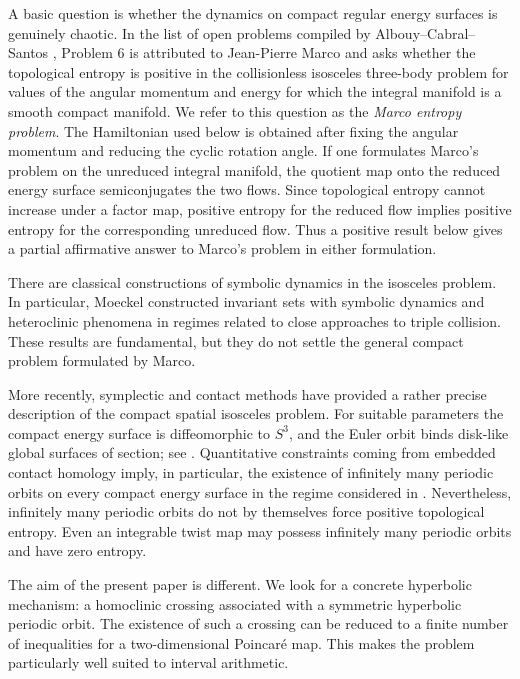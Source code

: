 \documentclass[11pt]{article}
\begin{document}
A basic question is whether the dynamics on compact regular energy surfaces
is genuinely chaotic.  In the list of open problems compiled by
Albouy--Cabral--Santos \cite{AlbouyCabralSantos}, Problem 6 is attributed to
Jean-Pierre Marco and asks whether the topological entropy is positive in
the collisionless isosceles three-body problem for values of the angular
momentum and energy for which the integral manifold is a smooth compact
manifold.  We refer to this question as the \emph{Marco entropy problem}.
The Hamiltonian used below is obtained after fixing the angular momentum and
reducing the cyclic rotation angle.  If one formulates Marco's problem on the
unreduced integral manifold, the quotient map onto the reduced energy surface
semiconjugates the two flows.  Since topological entropy cannot increase under
a factor map, positive entropy for the reduced flow implies positive entropy
for the corresponding unreduced flow.  Thus a positive result below gives a
partial affirmative answer to Marco's problem in either formulation.

There are classical constructions of symbolic dynamics in the isosceles
problem.  In particular, Moeckel \cite{Moeckel1984} constructed invariant
sets with symbolic dynamics and heteroclinic phenomena in regimes related to
close approaches to triple collision.  These results are fundamental, but
they do not settle the general compact problem formulated by Marco.

More recently, symplectic and contact methods have provided a rather precise
description of the compact spatial isosceles problem.  For suitable
parameters the compact energy surface is diffeomorphic to $S^3$, and the
Euler orbit binds disk-like global surfaces of section; see
\cite{HuLiuOuSalomaoYu}.  Quantitative constraints coming from embedded
contact homology imply, in particular, the existence of infinitely many
periodic orbits on every compact energy surface in the regime considered in
\cite{ECHconstraints}.  Nevertheless, infinitely many periodic orbits do not
by themselves force positive topological entropy.  Even an integrable twist
map may possess infinitely many periodic orbits and have zero entropy.

The aim of the present paper is different.  We look for a concrete
hyperbolic mechanism: a homoclinic crossing associated with a symmetric
hyperbolic periodic orbit.  The existence of such a crossing can be reduced
to a finite number of inequalities for a two-dimensional Poincar\'e map.
This makes the problem particularly well suited to interval arithmetic.
\end{document}
